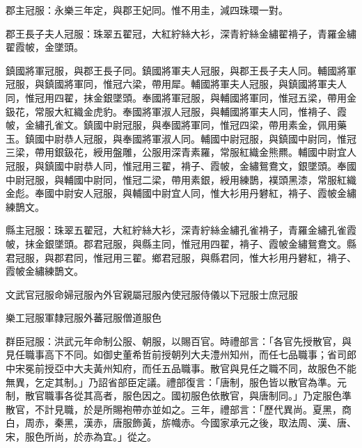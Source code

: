 郡主冠服：永樂三年定，與郡王妃同。惟不用圭，減四珠環一對。

郡王長子夫人冠服：珠翠五翟冠，大紅紵絲大衫，深青紵絲金繡翟褙子，青羅金繡翟霞帔，金墜頭。

鎮國將軍冠服，與郡王長子同。鎮國將軍夫人冠服，與郡王長子夫人同。輔國將軍冠服，與鎮國將軍同，惟冠六梁，帶用犀。輔國將軍夫人冠服，與鎮國將軍夫人同，惟冠用四翟，抹金銀墜頭。奉國將軍冠服，與輔國將軍同，惟冠五梁，帶用金鈒花，常服大紅織金虎豹。奉國將軍淑人冠服，與輔國將軍夫人同，惟褙子、霞帔，金繡孔雀文。鎮國中尉冠服，與奉國將軍同，惟冠四梁，帶用素金，佩用藥玉。鎮國中尉恭人冠服，與奉國將軍淑人同。輔國中尉冠服，與鎮國中尉同，惟冠三梁，帶用銀鈒花，綬用盤雕，公服用深青素羅，常服紅織金熊羆。輔國中尉宜人冠服，與鎮國中尉恭人同，惟冠用三翟，褙子、霞帔，金繡鴛鴦文，銀墜頭。奉國中尉冠服，與輔國中尉同，惟冠二梁，帶用素銀，綬用練鵲，襆頭黑漆，常服紅織金彪。奉國中尉安人冠服，與輔國中尉宜人同，惟大衫用丹礬紅，褙子、霞帔金繡練鵲文。

縣主冠服：珠翠五翟冠，大紅紵絲大衫，深青紵絲金繡孔雀褙子，青羅金繡孔雀霞帔，抹金銀墜頭。郡君冠服，與縣主同，惟冠用四翟，褙子、霞帔金繡鴛鴦文。縣君冠服，與郡君同，惟冠用三翟。鄉君冠服，與縣君同，惟大衫用丹礬紅，褙子、霞帔金繡練鵲文。

文武官冠服命婦冠服內外官親屬冠服內使冠服侍儀以下冠服士庶冠服

樂工冠服軍隸冠服外蕃冠服僧道服色

群臣冠服：洪武元年命制公服、朝服，以賜百官。時禮部言：「各官先授散官，與見任職事高下不同。如御史董希哲前授朝列大夫澧州知州，而任七品職事；省司郎中宋冕前授亞中大夫黃州知府，而任五品職事。散官與見任之職不同，故服色不能無異，乞定其制。」乃詔省部臣定議。禮部復言：「唐制，服色皆以散官為準。元制，散官職事各從其高者，服色因之。國初服色依散官，與唐制同。」乃定服色準散官，不計見職，於是所賜袍帶亦並如之。三年，禮部言：「歷代異尚。夏黑，商白，周赤，秦黑，漢赤，唐服飾黃，旂幟赤。今國家承元之後，取法周、漢、唐、宋，服色所尚，於赤為宜。」從之。

